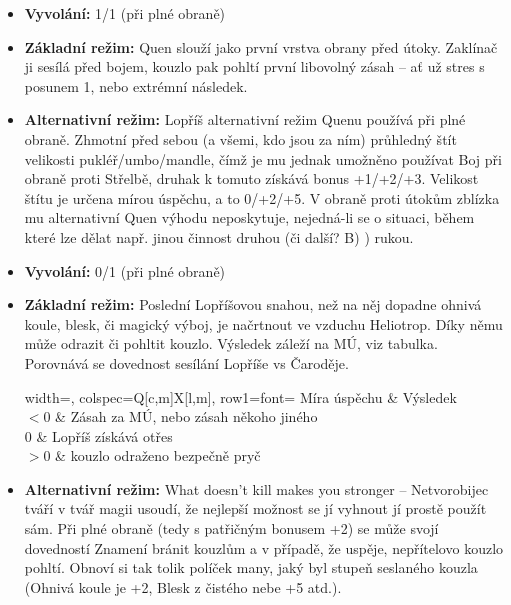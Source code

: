 \documentclass[../main.tex]{subfiles}
\begin{document}
\begin{specialita}[Quen]
\begin{itemize}
	\item \textbf{Vyvolání:} 1/1 (při plné obraně)
	\item \textbf{Základní režim:} Quen slouží jako první vrstva obrany před útoky. Zaklínač ji sesílá před bojem, kouzlo pak pohltí první libovolný zásah – ať už stres s posunem 1, nebo extrémní následek.
	\item \textbf{Alternativní režim:} Lopříš alternativní režim Quenu používá při plné obraně. Zhmotní před sebou (a všemi, kdo jsou za ním) průhledný štít velikosti pukléř/umbo/mandle, čímž je mu jednak umožněno používat Boj při obraně proti Střelbě, druhak k tomuto získává bonus +1/+2/+3. Velikost štítu je určena mírou úspěchu, a to 0/+2/+5. V obraně proti útokům zblízka mu alternativní Quen výhodu neposkytuje, nejedná-li se o situaci, během které lze dělat např. jinou činnost druhou (či další? B) ) rukou.
\end{itemize}
\end{specialita}

\begin{specialita}[Heliotrop]
\begin{itemize}
	\item \textbf{Vyvolání:} 0/1 (při plné obraně)
	\item \textbf{Základní režim:} Poslední Lopříšovou snahou, než na něj dopadne ohnivá koule, blesk, či magický výboj, je načrtnout ve vzduchu Heliotrop. Díky němu může odrazit či pohltit kouzlo. Výsledek záleží na MÚ, viz tabulka. Porovnává se dovednost sesílání Lopříše vs Čaroděje.
		\begin{center}
		\begin{tblr}{width=\linewidth, colspec={Q[c,m]X[l,m]}, row{1}={font=\bfseries}}
		\toprule
		Míra úspěchu & Výsledek \\ \midrule
		$<0$ & Zásah za MÚ, nebo zásah někoho jiného \\
		$0$ & Lopříš získává otřes \\
		$>0$ & kouzlo odraženo bezpečně pryč \\
		\bottomrule
		\end{tblr}
		\end{center}
	\item \textbf{Alternativní režim:} What doesn’t kill makes you stronger – Netvorobijec tváří v tvář magii usoudí, že nejlepší možnost se jí vyhnout jí prostě použít sám. Při plné obraně (tedy s patřičným bonusem +2) se může svojí dovedností Znamení bránit kouzlům a v případě, že uspěje, nepřítelovo kouzlo pohltí. Obnoví si tak tolik políček many, jaký byl stupeň seslaného kouzla (Ohnivá koule je +2, Blesk z čistého nebe +5 atd.).
\end{itemize}
\end{specialita}
\end{document}
